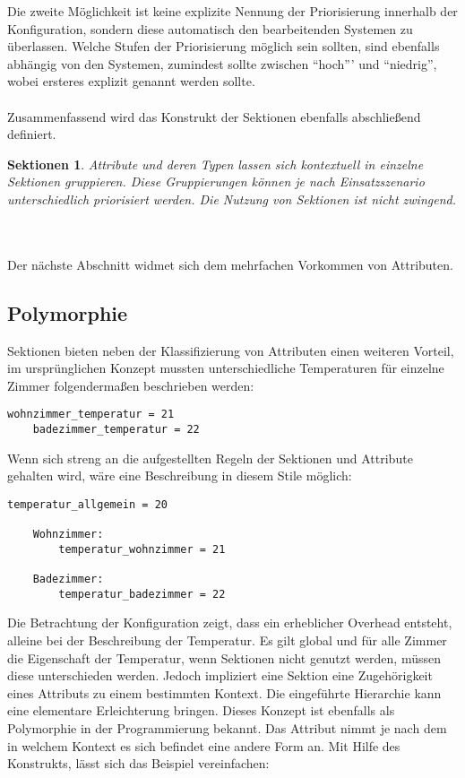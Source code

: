 Die zweite Möglichkeit ist keine explizite Nennung der Priorisierung innerhalb der Konfiguration, sondern diese automatisch den bearbeitenden Systemen zu überlassen. 
Welche Stufen der Priorisierung möglich sein sollten, sind ebenfalls abhängig von den Systemen, zumindest sollte zwischen "`hoch"'' und "`niedrig"', wobei ersteres explizit genannt werden sollte. 
\\\\
Zusammenfassend wird das Konstrukt der Sektionen ebenfalls abschließend definiert.
\newtheorem{mydef}{Sektionen}
\begin{mydef}
Attribute und deren Typen lassen sich kontextuell in einzelne Sektionen gruppieren. Diese Gruppierungen können je nach Einsatzszenario unterschiedlich priorisiert werden. Die Nutzung von Sektionen ist nicht zwingend.
\end{mydef}
\\\\
Der nächste Abschnitt widmet sich dem mehrfachen Vorkommen von Attributen.

\subsection{Polymorphie}
Sektionen bieten neben der Klassifizierung von Attributen einen weiteren Vorteil, im ursprünglichen Konzept mussten unterschiedliche Temperaturen für einzelne Zimmer folgendermaßen beschrieben werden:

\lstset{language=bash}
\begin{lstlisting}[caption=Sammlung von Attributen ohne Polymorphie, captionpos=b]
  wohnzimmer_temperatur = 21
	badezimmer_temperatur = 22
\end{lstlisting}

Wenn sich streng an die aufgestellten Regeln der Sektionen und Attribute gehalten wird, wäre eine Beschreibung in diesem Stile möglich: 


\lstset{language=bash}
\begin{lstlisting}[caption=Beispiel einer Konfiguration ohne Polymorphie, captionpos=b]
  temperatur_allgemein = 20
	
	Wohnzimmer: 
		temperatur_wohnzimmer = 21
	
	Badezimmer: 
		temperatur_badezimmer = 22

\end{lstlisting}
 
Die Betrachtung der Konfiguration zeigt, dass ein erheblicher Overhead entsteht, alleine bei der Beschreibung der Temperatur. Es gilt global und für alle Zimmer die Eigenschaft der Temperatur, wenn Sektionen nicht genutzt werden, müssen diese unterschieden werden. Jedoch impliziert eine Sektion eine Zugehörigkeit eines Attributs zu einem bestimmten Kontext. Die eingeführte Hierarchie kann eine elementare Erleichterung bringen. Dieses Konzept ist ebenfalls als Polymorphie in der Programmierung bekannt. Das Attribut nimmt je nach dem in welchem Kontext es sich befindet eine andere Form an. Mit Hilfe des Konstrukts, lässt sich das Beispiel vereinfachen: 

